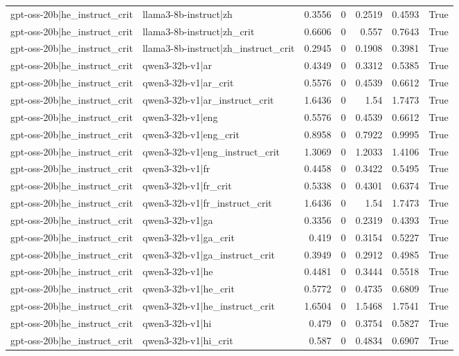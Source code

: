 \begin{table}
\begin{tabular}{l l r r r r l}
gpt-oss-20b|he_instruct_crit & llama3-8b-instruct|zh & 0.3556 & 0 & 0.2519 & 0.4593 & True \\
gpt-oss-20b|he_instruct_crit & llama3-8b-instruct|zh_crit & 0.6606 & 0 & 0.557 & 0.7643 & True \\
gpt-oss-20b|he_instruct_crit & llama3-8b-instruct|zh_instruct_crit & 0.2945 & 0 & 0.1908 & 0.3981 & True \\
gpt-oss-20b|he_instruct_crit & qwen3-32b-v1|ar & 0.4349 & 0 & 0.3312 & 0.5385 & True \\
gpt-oss-20b|he_instruct_crit & qwen3-32b-v1|ar_crit & 0.5576 & 0 & 0.4539 & 0.6612 & True \\
gpt-oss-20b|he_instruct_crit & qwen3-32b-v1|ar_instruct_crit & 1.6436 & 0 & 1.54 & 1.7473 & True \\
gpt-oss-20b|he_instruct_crit & qwen3-32b-v1|eng & 0.5576 & 0 & 0.4539 & 0.6612 & True \\
gpt-oss-20b|he_instruct_crit & qwen3-32b-v1|eng_crit & 0.8958 & 0 & 0.7922 & 0.9995 & True \\
gpt-oss-20b|he_instruct_crit & qwen3-32b-v1|eng_instruct_crit & 1.3069 & 0 & 1.2033 & 1.4106 & True \\
gpt-oss-20b|he_instruct_crit & qwen3-32b-v1|fr & 0.4458 & 0 & 0.3422 & 0.5495 & True \\
gpt-oss-20b|he_instruct_crit & qwen3-32b-v1|fr_crit & 0.5338 & 0 & 0.4301 & 0.6374 & True \\
gpt-oss-20b|he_instruct_crit & qwen3-32b-v1|fr_instruct_crit & 1.6436 & 0 & 1.54 & 1.7473 & True \\
gpt-oss-20b|he_instruct_crit & qwen3-32b-v1|ga & 0.3356 & 0 & 0.2319 & 0.4393 & True \\
gpt-oss-20b|he_instruct_crit & qwen3-32b-v1|ga_crit & 0.419 & 0 & 0.3154 & 0.5227 & True \\
gpt-oss-20b|he_instruct_crit & qwen3-32b-v1|ga_instruct_crit & 0.3949 & 0 & 0.2912 & 0.4985 & True \\
gpt-oss-20b|he_instruct_crit & qwen3-32b-v1|he & 0.4481 & 0 & 0.3444 & 0.5518 & True \\
gpt-oss-20b|he_instruct_crit & qwen3-32b-v1|he_crit & 0.5772 & 0 & 0.4735 & 0.6809 & True \\
gpt-oss-20b|he_instruct_crit & qwen3-32b-v1|he_instruct_crit & 1.6504 & 0 & 1.5468 & 1.7541 & True \\
gpt-oss-20b|he_instruct_crit & qwen3-32b-v1|hi & 0.479 & 0 & 0.3754 & 0.5827 & True \\
gpt-oss-20b|he_instruct_crit & qwen3-32b-v1|hi_crit & 0.587 & 0 & 0.4834 & 0.6907 & True \\

\end{tabular}
\end{table}
